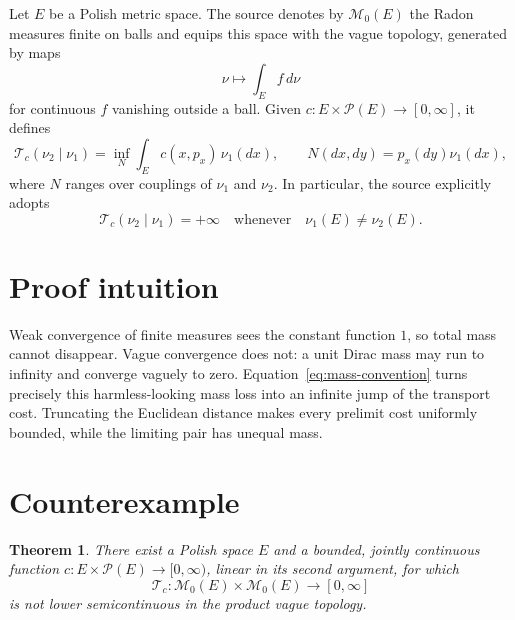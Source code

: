 \documentclass[11pt]{article}
\newcommand{\Mc}{\mathcal M}
\newcommand{\Pc}{\mathcal P}
\newcommand{\Tc}{\mathcal T_c}
\newtheorem{theorem}{Theorem}
\begin{document}
Let $E$ be a Polish metric space.  The source denotes by $\Mc_0(E)$ the Radon
measures finite on balls and equips this space with the vague topology,
generated by maps
\[
  \nu\longmapsto\int_E f\,d\nu
\]
for continuous $f$ vanishing outside a ball.  Given
$c:E\times\Pc(E)\to[0,\infty]$, it defines
\[
 \Tc(\nu_2\mid\nu_1)
 =\inf_N\int_E c(x,p_x)\,\nu_1(dx),
 \qquad N(dx,dy)=p_x(dy)\nu_1(dx),
\]
where $N$ ranges over couplings of $\nu_1$ and $\nu_2$.  In particular, the
source explicitly adopts
\begin{equation}\label{eq:mass-convention}
 \Tc(\nu_2\mid\nu_1)=+\infty
 \quad\text{whenever}\quad \nu_1(E)\ne\nu_2(E).
\end{equation}

\section{Proof intuition}

Weak convergence of finite measures sees the constant function $1$, so total
mass cannot disappear.  Vague convergence does not: a unit Dirac mass may run
to infinity and converge vaguely to zero.  Equation~\eqref{eq:mass-convention}
turns precisely this harmless-looking mass loss into an infinite jump of the
transport cost.  Truncating the Euclidean distance makes every prelimit cost
uniformly bounded, while the limiting pair has unequal mass.

\section{Counterexample}

\begin{theorem}\label{thm:counterexample}
There exist a Polish space $E$ and a bounded, jointly continuous function
$c:E\times\Pc(E)\to[0,\infty)$, linear in its second argument, for which
\[
 \Tc:\Mc_0(E)\times\Mc_0(E)\longrightarrow[0,\infty]
\]
is not lower semicontinuous in the product vague topology.
\end{theorem}
\end{document}
